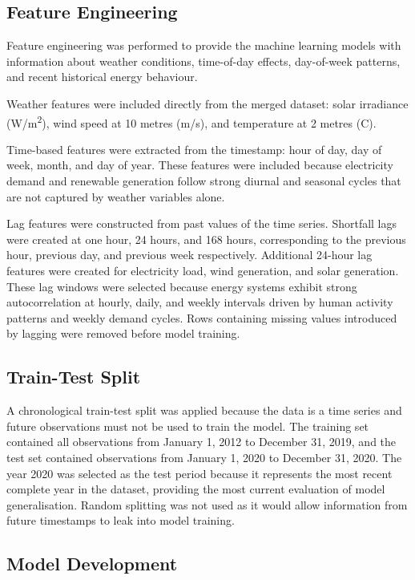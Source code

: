 \documentclass[conference]{IEEEtran}
\begin{document}
\subsection{Feature Engineering}
 
Feature engineering was performed to provide the machine learning models with information about weather conditions, time-of-day effects, day-of-week patterns, and recent historical energy behaviour.
 
Weather features were included directly from the merged dataset: solar irradiance (W/m\textsuperscript{2}), wind speed at 10 metres (m/s), and temperature at 2 metres (\textdegree C).
 
Time-based features were extracted from the timestamp: hour of day, day of week, month, and day of year. These features were included because electricity demand and renewable generation follow strong diurnal and seasonal cycles that are not captured by weather variables alone.
 
Lag features were constructed from past values of the time series. Shortfall lags were created at one hour, 24 hours, and 168 hours, corresponding to the previous hour, previous day, and previous week respectively. Additional 24-hour lag features were created for electricity load, wind generation, and solar generation. These lag windows were selected because energy systems exhibit strong autocorrelation at hourly, daily, and weekly intervals driven by human activity patterns and weekly demand cycles. Rows containing missing values introduced by lagging were removed before model training.
 
\subsection{Train-Test Split}
 
A chronological train-test split was applied because the data is a time series and future observations must not be used to train the model. The training set contained all observations from January 1, 2012 to December 31, 2019, and the test set contained observations from January 1, 2020 to December 31, 2020. The year 2020 was selected as the test period because it represents the most recent complete year in the dataset, providing the most current evaluation of model generalisation. Random splitting was not used as it would allow information from future timestamps to leak into model training.
 
\subsection{Model Development}
 
\end{document}
